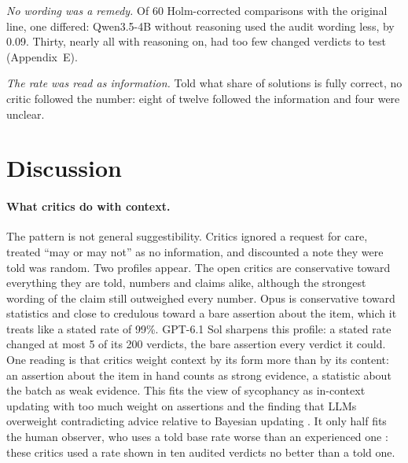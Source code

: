 \documentclass[letterpaper]{article} %
\begin{document}
\emph{No wording was a remedy.} Of 60 Holm-corrected comparisons with the original line, one differed: Qwen3.5-4B without reasoning used the audit wording less, by 0.09. Thirty, nearly all with reasoning on, had too few changed verdicts to test (Appendix~E).

\emph{The rate was read as information.} Told what share of solutions is fully correct, no critic followed the number: eight of twelve followed the information and four were unclear.

\section{Discussion}

\paragraph{What critics do with context.} The pattern is not general suggestibility. Critics ignored a request for care, treated ``may or may not'' as no information, and discounted a note they were told was random. Two profiles appear. The open critics are conservative toward everything they are told, numbers and claims alike, although the strongest wording of the claim still outweighed every number. Opus is conservative toward statistics and close to credulous toward a bare assertion about the item, which it treats like a stated rate of 99\%. GPT-6.1 Sol sharpens this profile: a stated rate changed at most 5 of its 200 verdicts, the bare assertion every verdict it could. One reading is that critics weight context by its form more than by its content: an assertion about the item in hand counts as strong evidence, a statistic about the batch as weak evidence. This fits the view of sycophancy as in-context updating with too much weight on assertions \citep{shapira2026sycophancy} and the finding that LLMs overweight contradicting advice relative to Bayesian updating \citep{kumaran2025overconfidence}. It only half fits the human observer, who uses a told base rate worse than an experienced one \citep{estes1995interactions}: these critics used a rate shown in ten audited verdicts no better than a told one.
\end{document}
